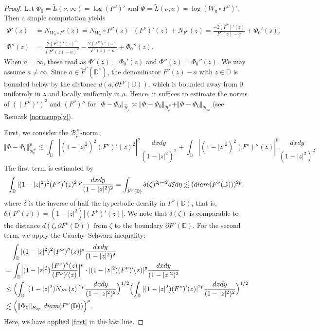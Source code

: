 \documentclass[amstex,12pt,reqno]{amsart}
\theoremstyle{definition}
\begin{document}
\begin{proof}
Let $\Phi_0=\widetilde L(\nu,\infty)=\log (F^\nu)'$ and $\Phi=\widetilde L(\nu,a)=\log (W_a \circ F^\nu)'$.
Then a simple computation yields
\begin{align}\label{1st2nd}
\Phi'(z)&=N_{W_a \circ F^\nu}(z)=N_{W_a} \circ F^\nu(z)\cdot (F^\nu)'(z)+N_{F^\nu}(z)
=\frac{-2(F^\nu)'(z)}{{F^\nu}(z)-a}+\Phi_0'(z);\\
\Phi''(z)&=\frac{2(F^\nu)'(z)^2}{(F^\nu(z)-a)^2}
-\frac{2(F^\nu)''(z)}{F^\nu(z)-a}+\Phi_0''(z).
\end{align}
When $a=\infty$, these read as $\Phi'(z)=\Phi_0'(z)$ and $\Phi''(z)=\Phi_0''(z)$. We may assume $a \neq \infty$.
Since $a \in \widetilde F^\nu(\mathbb D^*)$, the denominator $F^\nu(z)-a$ with $z \in \mathbb D$ is 
bounded below by the distance $d(a,\partial F^\nu(\mathbb D))$, which is bounded away from $0$
uniformly in $z$ and locally uniformly in $a$. Hence, it suffices to estimate the norms of $((F^\nu)')^2$ and 
$(F^\nu)''$ for $\Vert \Phi-\Phi_0 \Vert_{\widehat{\mathcal B}_p} \asymp \Vert \Phi-\Phi_0 \Vert_{{\mathcal B}^{\#}_p}
+\Vert \Phi-\Phi_0 \Vert_{{\mathcal B}_\infty}$ (see Remark \ref{normsupply}).

First, we consider the ${\mathcal B}^{\#}_p$-norm:
$$
\Vert \Phi-\Phi_0 \Vert_{{\mathcal B}^{\#}_p}^p\lesssim
\int_{\mathbb D}|(1-|z|^2)^2(F^\nu)'(z)^2|^p\frac{dxdy}{(1-|z|^2)^2}+
\int_{\mathbb D}|(1-|z|^2)^2(F^\nu)''(z)|^p\frac{dxdy}{(1-|z|^2)^2}.
$$
The first term is estimated by
\begin{equation}\label{first}
\int_{\mathbb D}|(1-|z|^2)^2(F^\nu)'(z)^2|^p\frac{dxdy}{(1-|z|^2)^2}=
\int_{F^\nu(\mathbb D)}\delta(\zeta)^{2p-2}d\xi d\eta \lesssim ({\rm diam}(F^\nu(\mathbb D)))^{2p},
\end{equation}
where $\delta$ is the inverse of half the hyperbolic density in $F^{\nu}(\mathbb D)$, that is,
$\delta(F^{\nu}(z))=(1-|z|^2)|(F^{\nu})'(z)|$. We note that $\delta(\zeta)$ is comparable
to the distance $d(\zeta, \partial F^{\nu}(\mathbb D))$ from $\zeta$ to the boundary $\partial F^{\nu}(\mathbb D)$.
For the second term, we apply the Cauchy--Schwarz inequality:
\begin{align}
&\quad\int_{\mathbb D}|(1-|z|^2)^2(F^\nu)''(z)|^p\frac{dxdy}{(1-|z|^2)^2}\\
&=\int_{\mathbb D}\Bigl|(1-|z|^2)\frac{(F^\nu)''(z)}{(F^\nu)'(z)}\Bigr|^p\cdot
|(1-|z|^2)(F^\nu)'(z)|^p\frac{dxdy}{(1-|z|^2)^2}\\
&\leq \Bigl(\int_{\mathbb D}|(1-|z|^2)N_{F^\nu}(z)|^{2p} \frac{dxdy}{(1-|z|^2)^2}\Bigr)^{1/2}
\Bigl(\int_{\mathbb D}|(1-|z|^2)(F^\nu)'(z)|^{2p} \frac{dxdy}{(1-|z|^2)^2}\Bigr)^{1/2}\\
&\lesssim \Bigl(\Vert \Phi_0 \Vert_{\mathcal B_{2p}}\
{\rm diam}(F^\nu(\mathbb D))
\Bigr)^{p}.
\end{align}
Here, we have applied \eqref{first} in the last line.


\end{proof}
\end{document}
